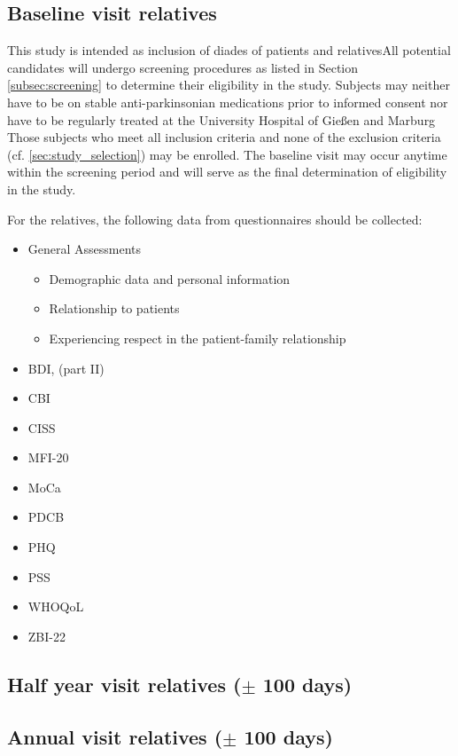 \documentclass[
	a4paper, 
	11.5pt,
	headings=small, 
	twoside, 
	titlepage=firstiscover, 
 	pagesize=auto,
  	version=last,
	open=any,
	BCOR=14mm,
  	chapterprefix=false]{scrbook}
\newcommand{\UKGM}[1]{University Hospital of Gießen and Marburg}
\begin{document}
\subsection{Baseline visit relatives}
This study is intended as inclusion of diades of patients and relativesAll potential candidates will undergo screening procedures as listed in Section \ref{subsec:screening} to determine their eligibility in the study. Subjects may neither have to be on stable anti-parkinsonian medications prior to informed consent nor have to be regularly treated at the \UKGM. Those subjects who meet all inclusion criteria and none of the exclusion criteria (cf. \ref{sec:study_selection}) may be enrolled. The baseline visit may occur anytime within the screening period and will serve as the final  determination of eligibility in the study. 

For the relatives, the following data from questionnaires should be collected:
\begin{itemize}
\item General Assessments
\begin{itemize}
\item Demographic data and personal information
\item Relationship to patients
\item Experiencing respect in the patient-family relationship
\end{itemize}
\item \acl{BDI}, (part II)
\item \ac{CBI}
\item \ac{CISS}
\item \ac{MFI-20}
\item \ac{MoCa}
\item \ac{PDCB}
\item \ac{PHQ}
\item \ac{PSS}
\item \ac{WHOQoL}
\item \ac{ZBI-22}
\end{itemize}

\subsection{Half year visit relatives ($\pm$ 100 days)}

\subsection{Annual visit relatives ($\pm$ 100 days)}
\end{document}
